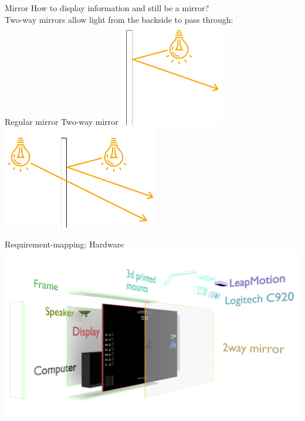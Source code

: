 \documentclass[xcolor=svgnames,handout,aspectratio=169]{beamer}
\begin{document}
\begin{frame}
	{Mirror}
	How to display information and still be a mirror?\\
	Two-way mirrors allow light from the backside to pass through:\\
	\vspace{0.5cm}
	\hspace{1cm} Regular mirror \hspace{5cm} Two-way mirror
	\includegraphics[height=4.5cm]{images/smartmirror_principle.png}
	\hspace{1.5cm}
	\includegraphics[height=4.5cm]{images/smartmirror_principle_2.png}
\end{frame}

\begin{frame}
	{Requirement-mapping: Hardware}
	\includegraphics[width=\linewidth]{images/mirror_split_color}
\end{frame}
\end{document}
